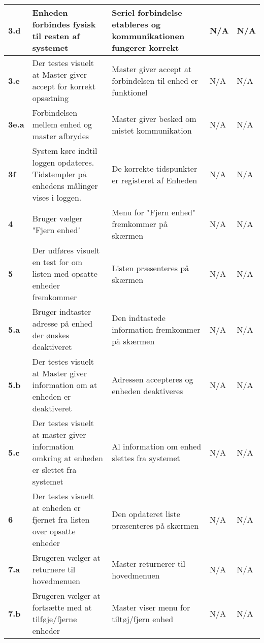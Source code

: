 \begin{center}
\begin{longtable}{|p{}|p{}|p{}|p{}|p{}|}
\textbf{3.d}&Enheden forbindes fysisk til resten af systemet
			&Seriel forbindelse etableres og kommunikationen fungerer korrekt 
			&N/A
			&N/A \\\hline  
			
\textbf{3.e}&Der testes visuelt at Master giver accept for korrekt opsætning
			&Master giver accept at forbindelsen til enhed er funktionel
			&N/A 
			&N/A \\\hline 
			
\textbf{3e.a}&Forbindelsen mellem enhed og master afbrydes
			&Master giver besked om mistet kommunikation
			&N/A 
			&N/A \\\hline
			
\textbf{3f}&System køre indtil loggen opdateres. Tidstempler på enhedens målinger vises i loggen.
			&De korrekte tidspunkter er registeret af Enheden
			&N/A 
			&N/A \\\hline
						
\textbf{4}	&Bruger vælger "Fjern enhed" 
			&Menu for "Fjern enhed" fremkommer på skærmen 
			&N/A 
			&N/A \\\hline
			 
\textbf{5}	&Der udføres visuelt en test for om listen med opsatte enheder fremkommer 
			&Listen præsenteres på skærmen 
			&N/A 
			&N/A \\\hline
			 
\textbf{5.a}&Bruger indtaster adresse på enhed der ønskes deaktiveret 
			&Den indtastede information fremkommer på skærmen
			&N/A 
			&N/A \\\hline
			 
\textbf{5.b}&Der testes visuelt at Master giver information om at enheden er deaktiveret
			&Adressen accepteres og enheden deaktiveres
			&N/A 
			&N/A \\\hline
			
\textbf{5.c}&Der testes visuelt at master giver information omkring at enheden er slettet fra systemet
			&Al information om enhed slettes fra systemet 
			&N/A 
			&N/A \\\hline
			 
\textbf{6}	&Der testes visuelt at enheden er fjernet fra listen over opsatte enheder 
			&Den opdateret liste præsenteres på skærmen 
			&N/A 
			&N/A \\\hline
			 
\textbf{7.a}	&Brugeren vælger at returnere til hovedmenuen
			&Master returnerer til hovedmenuen
			&N/A
			&N/A \\\hline

\textbf{7.b}	&Brugeren vælger at fortsætte med at tilføje/fjerne enheder
			&Master viser menu for tiltøj/fjern enhed 
			&N/A
			&N/A \\\hline

\end{longtable}
	\label{ATUC1} 
\end{center}